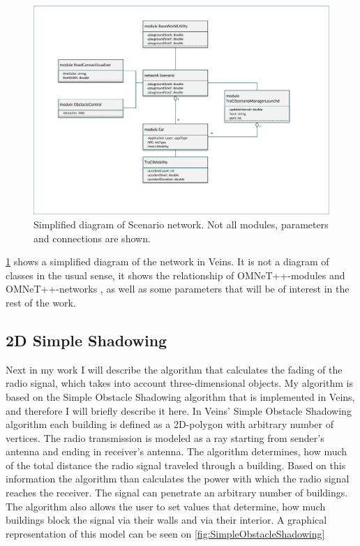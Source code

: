 \documentclass[]{nsm-thesis}
\begin{document}
\begin{figure}
	\centering
	\includegraphics[width=1\textwidth]{figures/Scenario.pdf}
	\caption{Simplified diagram of Scenario \cite{scenarioned} network. Not all modules, parameters and connections are shown.}
	\label{fig:scenarioned}
\end{figure}

\cref{fig:scenarioned} shows a simplified diagram of the network in Veins. It is not a diagram of classes in the usual sense, it shows the relationship of OMNeT++-modules and OMNeT++-networks , as well as some parameters that will be of interest in the rest of the work. 

\subsection{2D Simple Shadowing}

Next in my work I will describe the algorithm that calculates the fading of the radio signal, which takes into account three-dimensional objects. My algorithm is based on the Simple Obstacle Shadowing algorithm \cite{SimpleObstacleShadowing} that is implemented in Veins, and therefore I will briefly describe it here. In Veins' Simple Obstacle Shadowing algorithm each building is defined as a 2D-polygon with arbitrary number of vertices. The radio transmission is modeled as a ray starting from sender's antenna and ending in receiver's antenna. The algorithm determines, how much of the total distance the radio signal traveled through a building. Based on this information the algorithm than calculates the power with which the radio signal reaches the receiver. The signal can penetrate an arbitrary number of buildings. The algorithm also allows the user to set values that determine, how much buildings block the signal via their walls and via their interior. A graphical representation of this model can be seen on \cref{fig:SimpleObstacleShadowing}
\end{document}
